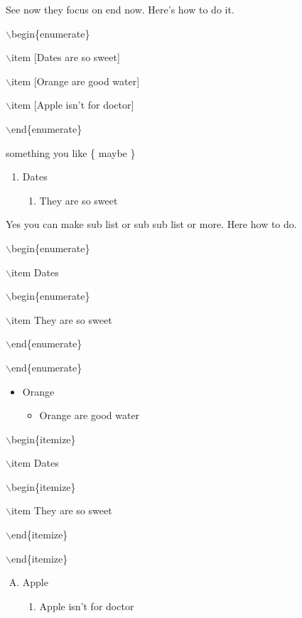 \documentclass[11pt]{article}
\begin{document}
See now they focus on end now. Here's how to do it.

$\backslash$begin\{enumerate\}

$\backslash$item [Dates are so sweet]

$\backslash$item [Orange are good water]

$\backslash$item [Apple isn't for doctor]

$\backslash$end\{enumerate\}

something you like \{ maybe \}

\begin{enumerate}
\item Dates
\begin{enumerate}
\item They are so sweet
\end{enumerate}
\end{enumerate}

Yes you can make sub list or sub sub list or more. Here how to do.

$\backslash$begin\{enumerate\}

$\backslash$item Dates

$\backslash$begin\{enumerate\}

$\backslash$item They are so sweet

$\backslash$end\{enumerate\}

$\backslash$end\{enumerate\}

\begin{itemize}
\item Orange
\begin{itemize}
\item Orange are good water
\end{itemize}
\end{itemize}

$\backslash$begin\{itemize\}

$\backslash$item Dates

$\backslash$begin\{itemize\}

$\backslash$item They are so sweet

$\backslash$end\{itemize\}

$\backslash$end\{itemize\}

\pagebreak

\begin{enumerate}[A.]
\item Apple
\begin{enumerate}
\item Apple isn't for doctor
\end{enumerate}
\end{enumerate}
\end{document}
